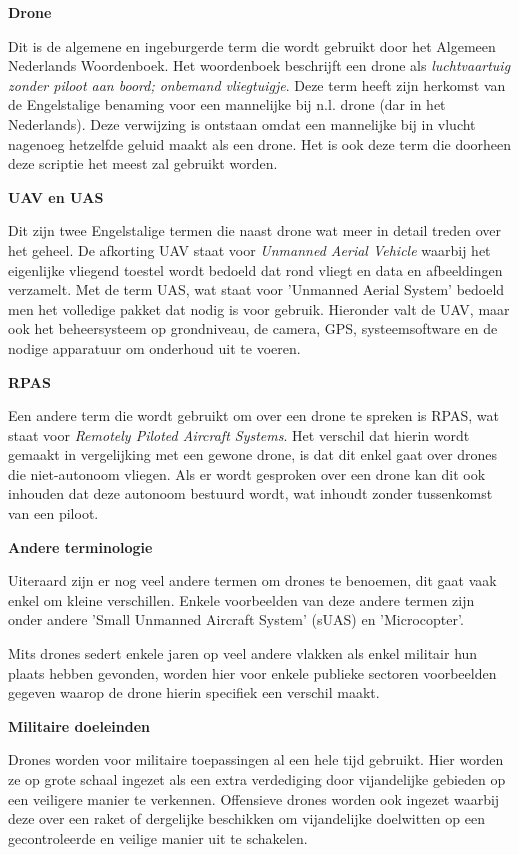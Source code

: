 \textbf{Drone}

Dit is de algemene en ingeburgerde term die wordt gebruikt door het Algemeen Nederlands Woordenboek. Het woordenboek\textcite{VanDale2020} beschrijft een drone als \textit{luchtvaartuig zonder piloot aan boord; onbemand vliegtuigje}. Deze term heeft zijn herkomst van de Engelstalige benaming voor een mannelijke bij n.l. drone (dar in het Nederlands). Deze verwijzing is ontstaan omdat een mannelijke bij in vlucht nagenoeg hetzelfde geluid maakt als een drone. Het is ook deze term die doorheen deze scriptie het meest zal gebruikt worden.

\textbf{UAV en UAS}

Dit zijn twee Engelstalige termen die naast drone wat meer in detail treden over het geheel. De afkorting UAV staat voor \textit{Unmanned Aerial Vehicle} waarbij het eigenlijke vliegend toestel wordt bedoeld dat rond vliegt en data en afbeeldingen verzamelt. Met de term UAS, wat staat voor 'Unmanned Aerial System' bedoeld men het volledige pakket dat nodig is voor gebruik. Hieronder valt de UAV, maar ook het beheersysteem op grondniveau, de camera, GPS, systeemsoftware en de nodige apparatuur om onderhoud uit te voeren. \autocite{Jurovich2017}

\textbf{RPAS}

Een andere term die wordt gebruikt om over een drone te spreken is RPAS, wat staat voor \textit{Remotely Piloted Aircraft Systems}. Het verschil dat hierin wordt gemaakt in vergelijking met een gewone drone, is dat dit enkel gaat over drones die niet-autonoom vliegen. Als er wordt gesproken over een drone kan dit ook inhouden dat deze autonoom bestuurd wordt, wat inhoudt zonder tussenkomst van een piloot.

\textbf{Andere terminologie}

Uiteraard zijn er nog veel andere termen om drones te benoemen, dit gaat vaak enkel om kleine verschillen. Enkele voorbeelden van deze andere termen zijn onder andere 'Small Unmanned Aircraft System' (sUAS) en 'Microcopter'.

Mits drones sedert enkele jaren op veel andere vlakken als enkel militair hun plaats hebben gevonden, worden hier voor enkele publieke sectoren voorbeelden gegeven waarop de drone hierin specifiek een verschil maakt.

\textbf{Militaire doeleinden}

Drones worden voor militaire toepassingen al een hele tijd gebruikt. Hier worden ze op grote schaal ingezet als een extra verdediging door vijandelijke gebieden op een veiligere manier te verkennen. Offensieve drones worden ook ingezet waarbij deze over een raket of dergelijke beschikken om vijandelijke doelwitten op een gecontroleerde en veilige manier uit te schakelen.\autocite{Brown2016}


